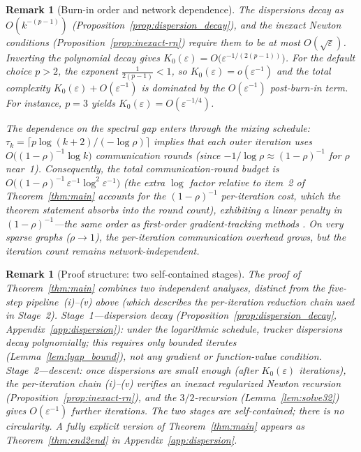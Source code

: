 \documentclass[11pt,a4paper]{article}
\def\cO{O}%
\newtheorem{remark}[theorem]{Remark}
\newcommand{\cO}{\mathcal{O}}
\begin{document}
\begin{remark}[Burn-in order and network dependence]\label{rem:burnin_order}
The dispersions decay as $\cO(k^{-(p-1)})$
(Proposition~\ref{prop:dispersion_decay}), and the inexact Newton
conditions (Proposition~\ref{prop:inexact-rn}) require them to be at
most $\cO(\sqrt\varepsilon)$.
Inverting the polynomial decay gives
$K_0(\varepsilon)=\cO\!\bigl(\varepsilon^{-1/(2(p-1))}\bigr)$.
For the default choice $p>2$, the exponent $\frac{1}{2(p-1)}<1$, so
$K_0(\varepsilon)=o(\varepsilon^{-1})$ and the total complexity
$K_0(\varepsilon)+\cO(\varepsilon^{-1})$ is dominated by the
$\cO(\varepsilon^{-1})$ post-burn-in term.
For instance, $p=3$ yields
$K_0(\varepsilon)=\cO(\varepsilon^{-1/4})$.

The dependence on the spectral gap enters through the mixing schedule:
$\tau_k=\lceil p\log(k{+}2)/({-\log\rho})\rceil$ implies that each
outer iteration uses $\cO\!\bigl((1{-}\rho)^{-1}\log k\bigr)$
communication rounds (since $-1/\log\rho\approx(1{-}\rho)^{-1}$ for
$\rho$ near~1).
Consequently, the total communication-round budget is
$\cO\!\bigl((1{-}\rho)^{-1}\,\varepsilon^{-1}\log^2\varepsilon^{-1}\bigr)$
(the extra $\log$ factor relative to item~2 of Theorem~\ref{thm:main}
accounts for the $(1{-}\rho)^{-1}$ per-iteration cost, which the
theorem statement absorbs into the round count),
exhibiting a \emph{linear} penalty in $(1{-}\rho)^{-1}$---the same
order as first-order gradient-tracking methods
\citep{nedic2017diging}.
On very sparse graphs ($\rho\to 1$), the per-iteration communication
overhead grows, but the iteration count remains network-independent.
\end{remark}

\begin{remark}[Proof structure: two self-contained stages]
The proof of Theorem~\ref{thm:main} combines two independent
analyses, distinct from the five-step pipeline~(i)--(v) above
(which describes the \emph{per-iteration} reduction chain used
in Stage~2).
\emph{Stage~1---dispersion decay}
(Proposition~\ref{prop:dispersion_decay},
Appendix~\ref{app:dispersion}): under the logarithmic schedule,
tracker dispersions decay polynomially; this requires only
bounded iterates (Lemma~\ref{lem:lyap_bound}), not any gradient
or function-value condition.
\emph{Stage~2---descent}: once dispersions are small enough
(after $K_0(\varepsilon)$ iterations), the per-iteration chain
(i)--(v) verifies an inexact regularized Newton recursion
(Proposition~\ref{prop:inexact-rn}), and the $3/2$-recursion
(Lemma~\ref{lem:solve32}) gives $\cO(\varepsilon^{-1})$ further
iterations.
The two stages are self-contained; there is no circularity.
A fully explicit version of Theorem~\ref{thm:main} appears as
Theorem~\ref{thm:end2end} in Appendix~\ref{app:dispersion}.
\end{remark}
\end{document}
